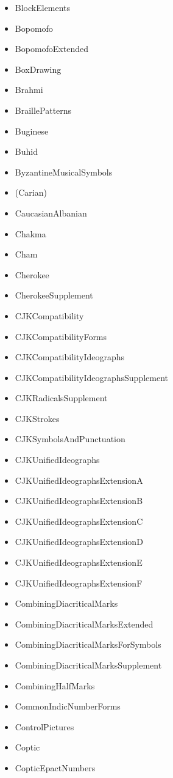 \documentclass{article}
\newenvironment{itemlist}{%
  \begin{itemize}
	\setlength{\itemsep}{0pt}
	\setlength{\parsep}{0pt}
	\setlength{\topsep}{0pt}
	\setlength{\partopsep}{0pt}
	\setlength{\parskip}{0pt}
	\setlength{\labelsep}{5pt}}%
{
  \end{itemize}}
\begin{document}
\begin{multicols*}{2}
\begin{itemlist}
				\item BlockElements
				\item Bopomofo
				\item BopomofoExtended
				\item BoxDrawing
				\item Brahmi
				\item BraillePatterns
				\item Buginese
				\item Buhid
				\item ByzantineMusicalSymbols
				\item (Carian)
				\item CaucasianAlbanian
				\item Chakma
				\item Cham
				\item Cherokee
				\item CherokeeSupplement
				\item CJKCompatibility
				\item CJKCompatibilityForms
				\item CJKCompatibilityIdeographs
				\item CJKCompatibilityIdeographsSupplement
				\item CJKRadicalsSupplement
				\item CJKStrokes
				\item CJKSymbolsAndPunctuation
				\item CJKUnifiedIdeographs
				\item CJKUnifiedIdeographsExtensionA
				\item CJKUnifiedIdeographsExtensionB
				\item CJKUnifiedIdeographsExtensionC
				\item CJKUnifiedIdeographsExtensionD
				\item CJKUnifiedIdeographsExtensionE
				\item CJKUnifiedIdeographsExtensionF
				\item CombiningDiacriticalMarks
				\item CombiningDiacriticalMarksExtended
				\item CombiningDiacriticalMarksForSymbols
				\item CombiningDiacriticalMarksSupplement
				\item CombiningHalfMarks
				\item CommonIndicNumberForms
				\item ControlPictures
				\item Coptic
				\item CopticEpactNumbers

\end{itemlist}
\end{multicols*}
\end{document}
